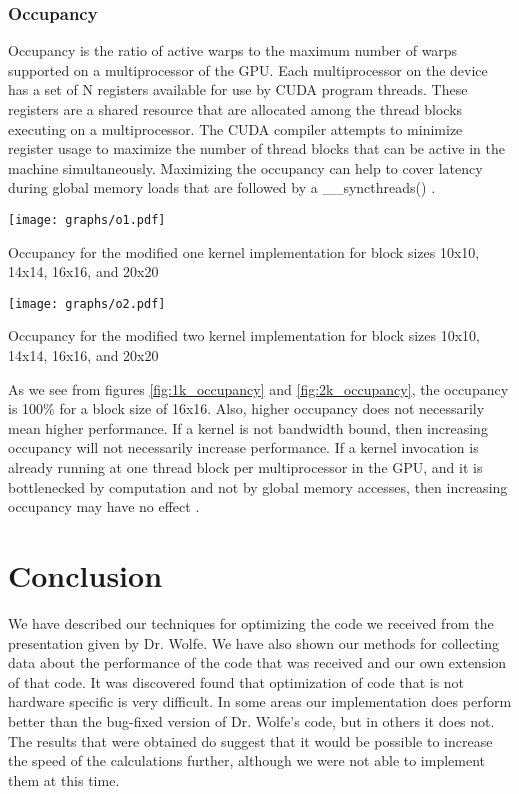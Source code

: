\documentclass[10pt]{article}
\makeatletter
\newenvironment{figurehere}
{\def\@captype{figure}}
{}
\makeatother
\begin{document}
\begin{multicols}{2}
  \subsubsection{Occupancy}
  Occupancy is the ratio of active warps to the maximum number of warps supported on a multiprocessor of the GPU.
  Each multiprocessor on the device has a set of N registers available for use by CUDA program threads.
  These registers are a shared resource that are allocated among the thread blocks executing on a multiprocessor.
  The CUDA compiler attempts to minimize register usage to maximize the number of thread blocks that can be active in the machine simultaneously.
  Maximizing the occupancy can help to cover latency during global memory loads that are followed by a \_\_syncthreads() \cite{bib:nvidia}.

  \begin{figurehere}
    \centering
    \texttt{[image: graphs/o1.pdf]}
    \caption{Occupancy for the modified one kernel implementation for block sizes 10x10, 14x14, 16x16, and 20x20}
    \label{fig:1k_occupancy}
  \end{figurehere}

  \begin{figurehere}
    \centering
    \texttt{[image: graphs/o2.pdf]}
    \caption{Occupancy for the modified two kernel implementation for block sizes 10x10, 14x14, 16x16, and 20x20}
    \label{fig:2k_occupancy}
  \end{figurehere}

  As we see from figures \ref{fig:1k_occupancy} and \ref{fig:2k_occupancy}, the occupancy is 100\% for a block size of 16x16.
  Also, higher occupancy does not necessarily mean higher performance.
  If a kernel is not bandwidth bound, then increasing occupancy will not necessarily increase performance.
  If a kernel invocation is already running at one thread block per multiprocessor in the GPU, and it is bottlenecked by computation and not by global memory accesses, then increasing occupancy may have no effect \cite{bib:nvidia}.

  \section{Conclusion} %
  \label{sec:conclusion}
  We have described our techniques for optimizing the code we received from the presentation given by Dr. Wolfe.
  We have also shown our methods for collecting data about the performance of the code that was received and our own extension of that code.
  It was discovered found that optimization of code that is not hardware specific is very difficult.
  In some areas our implementation does perform better than the bug-fixed version of Dr. Wolfe's code, but in others it does not.
  The results that were obtained do suggest that it would be possible to increase the speed of the calculations further, although we were not able to implement them at this time.


\end{multicols}
\end{document}
